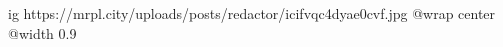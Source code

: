  
 
 
 
 

\ifcmt
  ig https://mrpl.city/uploads/posts/redactor/icifvqc4dyae0cvf.jpg
  @wrap center
  @width 0.9
\fi
